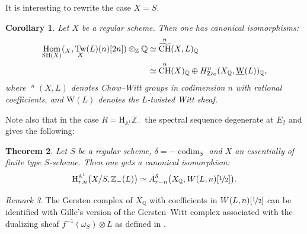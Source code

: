 \documentclass[11pt]{article}
\makeatletter
\numberwithin{equation}{section}\renewcommand{\encodingdefault}{TU}
\DeclareRobustCommand{\mathbbm}[1]{\csname jepbb@#1\endcsname}
\renewcommand{\AA}{\mathbb A}
\newcommand{\un}{\mathbbm 1}
\newcommand{\uW}{\underline{\mathrm W}}
\newcommand{\HA}{\mathrm H_{\AA^1}}
\newcommand{\BA}{\mathrm H^{\AA^1}}
\DeclareMathOperator{\codim}{codim}
\DeclareMathOperator{\SH}{SH}
\DeclareMathOperator{\Hom}{Hom}
\DeclareMathOperator{\CH}{CH}
\DeclareMathOperator{\wCH}{\widetilde{CH}}
\DeclareMathOperator{\Tw}{Tw}
\newcommand{\ZZ} {\mathbb Z}
\newcommand{\ot} {{\nicefrac 1 2}}
\newcommand{\QQ} {\mathbb Q}
\newcommand{\zar}{\mathrm{Zar}}
\newtheorem{thm}{Theorem}[section]
\newtheorem{cor}[thm]{Corollary}
\theoremstyle{remark}
\newtheorem{rem}[thm]{Remark}
\theoremstyle{definition}
\numberwithin{equation}{thm}
\makeatother
\begin{document}
It is interesting to rewrite the case $X=S$.
\begin{cor}
Let $X$ be a regular scheme. Then one has canonical isomorphisms:
\begin{align*}
\Hom_{\SH(X)}(\un_X,\Tw_X(L)(n)[2n]) \otimes_\ZZ\QQ &\simeq \wCH^n(X,L)_\QQ \\
&\simeq \CH^n(X)_\QQ \oplus H^n_\zar(X_\QQ,\uW(L))_\QQ,
\end{align*}
where $\wCH^n(X,L)$ denotes Chow--Witt groups in codimension $n$ with rational coefficients,
and $\uW(L)$ denotes the $L$-twisted Witt sheaf.
\end{cor}

Note also that in the case $R=\HA \ZZ_-$ the spectral sequence degenerate at $E_2$
and gives the following:
\begin{thm}\label{thm:biv_A1minus&Wittcoh}
Let $S$ be a regular scheme, $\delta=-\codim_S$ and $X$ an essentially of finite type $S$-scheme.
Then one gets a canonical isomorphism:
\[
\BA_{r,n}\big(X/S,\ZZ_-(L)\big) \simeq
A^\delta_{r-n}\big(X_\QQ,W(L,n)[\ot]\big).
\]
\end{thm}

\begin{rem}
The Gersten complex of $X_\QQ$ with coefficients in $W(L,n)[\ot]$ can be identified
with Gille's version of the Gersten--Witt complex associated with the dualizing sheaf
$f^{-1}(\omega_S) \otimes L$ as defined in \cite{Gille}.
\end{rem}
\end{document}
